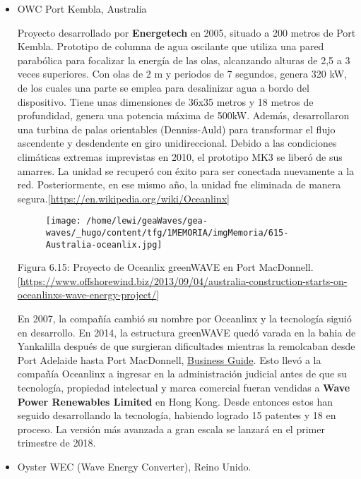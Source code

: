 \documentclass[]{article}
\begin{document}
\begin{itemize}
\item
  OWC Port Kembla, Australia

  Proyecto desarrollado por \textbf{Energetech} en 2005, situado a 200
  metros de Port Kembla. Prototipo de columna de agua oscilante que
  utiliza una pared parabólica para focalizar la energía de las olas,
  alcanzando alturas de 2,5 a 3 veces superiores. Con olas de 2 m y
  periodos de 7 segundos, genera 320 kW, de los cuales una parte se
  emplea para desalinizar agua a bordo del dispositivo. Tiene unas
  dimensiones de 36x35 metros y 18 metros de profundidad, genera una
  potencia máxima de 500kW. Además, desarrollaron una turbina de palas
  orientables (Denniss-Auld) para transformar el flujo ascendente y
  desdendente en giro unidireccional. Debido a las condiciones
  climáticas extremas imprevistas en 2010, el prototipo MK3 se liberó de
  sus amarres. La unidad se recuperó con éxito para ser conectada
  nuevamente a la red. Posteriormente, en ese mismo año, la unidad fue
  eliminada de manera
  segura.{[}\url{https://en.wikipedia.org/wiki/Oceanlinx}{]}

  \begin{figure}
  \centering
  \texttt{[image: /home/lewi/geaWaves/gea-waves/\_hugo/content/tfg/1MEMORIA/imgMemoria/615-Australia-oceanlix.jpg]}
  \caption{}
  \end{figure}

  Figura 6.15: Proyecto de Oceanlix greenWAVE en Port MacDonnell.
  {[}\url{https://www.offshorewind.biz/2013/09/04/australia-construction-starts-on-oceanlinxs-wave-energy-project/}{]}

  En 2007, la compañía cambió su nombre por Oceanlinx y la tecnología
  siguió en desarrollo. En 2014, la estructura greenWAVE quedó varada en
  la bahia de Yankalilla después de que surgieran dificultades mientras
  la remolcaban desde Port Adelaide hasta Port MacDonnell,
  \href{https://www.offshorewind.biz/2015/04/14/greenwave-still-stranded-off-south-australia/}{Business
  Guide}. Esto llevó a la compañía Oceanlinx a ingresar en la
  administración judicial antes de que su tecnología, propiedad
  intelectual y marca comercial fueran vendidas a \textbf{Wave Power
  Renewables Limited} en Hong Kong. Desde entonces estos han seguido
  desarrollando la tecnología, habiendo logrado 15 patentes y 18 en
  proceso. La versión más avanzada a gran escala se lanzará en el primer
  trimestre de 2018.\\
\item
  Oyster WEC (Wave Energy Converter), Reino Unido.


\end{itemize}
\end{document}
